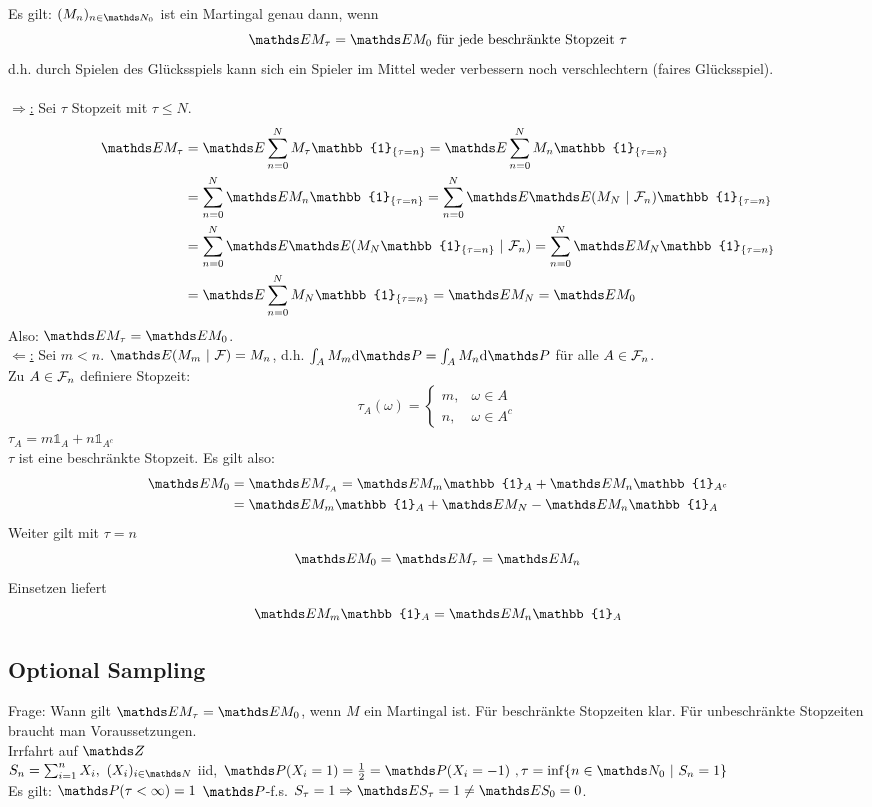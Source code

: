 Es gilt: $(M_n)_{n\in \N_0}$ ist ein Martingal genau dann, wenn \[\E M_{\tau}=\E M_0 \text{ für jede beschränkte Stopzeit }\tau \]
d.h. durch Spielen des Glücksspiels kann sich ein Spieler im Mittel weder verbessern noch verschlechtern (faires Glücksspiel).\\

\\
\uline{$\Rightarrow$:} Sei $\tau$ Stopzeit mit $\tau\le N$.
\begin{equation*}
\begin{aligned}
	\E M_\tau &=\E \sum_{n=0}^{N}M_\tau \mathbb{1}_{\{\tau=n\}}= \E \sum_{n=0}^{N}M_n \mathbb{1}_{\{\tau=n\}}\\ 
	&=\sum_{n=0}^{N}\E M_n \mathbb{1}_{\{\tau=n\}}= \sum_{n=0}^{N}\E\E(M_N~|~\F_n) \mathbb{1}_{\{\tau=n\}}\\
	&= \sum_{n=0}^{N}\E\E(M_N\mathbb{1}_{\{\tau=n\}}~|~\F_n)= \sum_{n=0}^{N}\E M_N\mathbb{1}_{\{\tau=n\}}\\
	&=\E\sum_{n=0}^{N}M_N \mathbb{1}_{\{\tau=n\}}= \E M_N= \E M_0
\end{aligned}
\end{equation*}
Also: $\E M_\tau=\E M_0$.\\

\uline{$\Leftarrow$:} Sei $m<n$. \zz $\E(M_m~|~\F)=M_n$, d.h. $\int_A M_m\dint \Pw = \int_A M_n\dint\Pw$ für alle $A\in \mathcal{F}_n$.\\
Zu $A\in \mathcal{F}_n$ definiere Stopzeit:
\[\tau_A(\omega)=\left\{\begin{array}{cl}  m, & \omega\in A\\ n, & \omega \in A^c   \end{array}\right. \]
$\tau_A=m\mathbb{1}_A+n\mathbb{1}_{A^c}$\\
$\tau$ ist eine beschränkte Stopzeit. Es gilt also:
\begin{equation*}
\begin{aligned}
	\E M_0 &=\E M_{\tau_A}= \E M_m\mathbb{1}_A+ \E M_n \mathbb{1}_{A^c}\\
	&= \E  M_m\mathbb{1}_A+ \E M_N- \E M_n \mathbb{1}_{A}
\end{aligned}
\end{equation*}
Weiter gilt mit $\tau = n$ \[\E M_0=\E M_\tau =\E M_n \]
Einsetzen  liefert \[\E M_m\mathbb{1}_A=\E M_n\mathbb{1}_A \]

\subsection{Optional Sampling}
\label{sub:opt_sampling}
Frage: Wann gilt $\E M_\tau=\E M_0$, wenn $M$ ein Martingal ist. Für beschränkte Stopzeiten klar. Für unbeschränkte Stopzeiten braucht man Voraussetzungen.\\
 Irrfahrt auf $\Z$\\
$S_n=\sum_{i=1}^{n}X_i,~ (X_i)_{i\in \N}$ iid, $\Pw(X_i=1)=\frac{1}{2}=\Pw(X_i=-1)~, \tau=\inf\{n\in \N_0~|~S_n=1\}$\\
Es gilt: $\Pw(\tau<\infty)=1$ $\Pw$-f.s. $S_\tau=1\Rightarrow \E S_\tau=1\not=\E S_0=0$.

